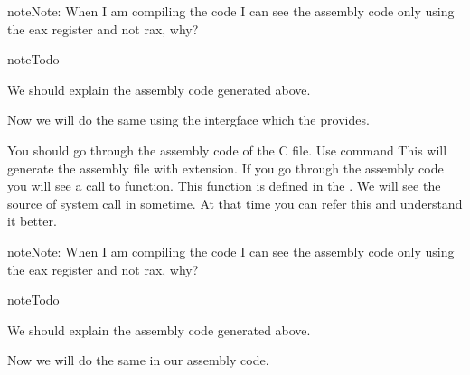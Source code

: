 \documentclass[letterpaper,10pt,english]{sphinxmanual}
\begin{document}
\begin{sphinxadmonition}{note}{Note:}
When I am compiling the code I can see the assembly code only using the eax register and not rax, why?
\end{sphinxadmonition}

\begin{sphinxadmonition}{note}{Todo}

We should explain the assembly code generated above.
\end{sphinxadmonition}

Now we will do the same using the  intergface which the  provides.

\begin{sphinxVerbatim}[commandchars=\\\{\},numbers=left,firstnumber=1,stepnumber=1]
 
 


  
        
     
\end{sphinxVerbatim}

You should go through the assembly code of the C file. Use command  This will generate the assembly file with  extension. If you
go through the assembly code you will see a call to  function. This
function is defined in the . We will see the source of 
system call in sometime. At that time you can refer this and understand it
better.

\begin{sphinxadmonition}{note}{Note:}
When I am compiling the code I can see the assembly code only using the eax register and not rax, why?
\end{sphinxadmonition}

\begin{sphinxadmonition}{note}{Todo}

We should explain the assembly code generated above.
\end{sphinxadmonition}

Now we will do the same in our assembly code.
\end{document}
